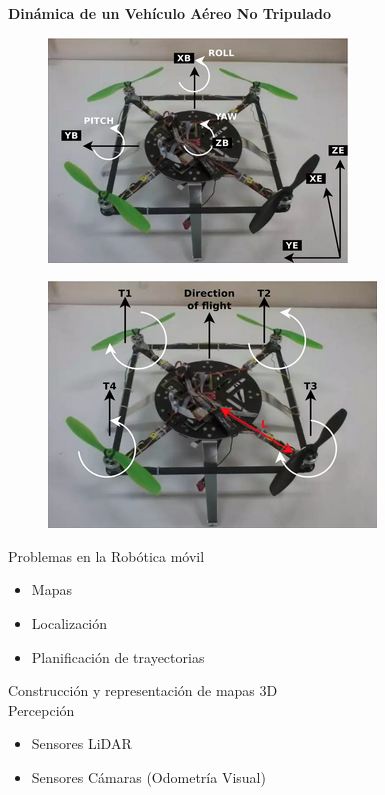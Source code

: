 \documentclass[
	11pt, %
]{beamer}
\begin{document}
\begin{frame}
  \textbf{Dinámica de un Vehículo Aéreo No Tripulado}

  \begin{figure}
    \includegraphics[width=0.5\linewidth]{d4.png}
  \end{figure}

  \begin{figure}
    \includegraphics[width=0.5\linewidth]{d5.png}
  \end{figure}
\end{frame}

\begin{frame}
  Problemas en la Robótica móvil
  \begin{itemize}
  \item Mapas
  \item Localización
  \item Planificación de trayectorias
  \end{itemize}
\end{frame}


\begin{frame}
  Construcción y representación de mapas 3D\\
  Percepción
  \begin{itemize}
  \item Sensores LiDAR
  \item Sensores Cámaras (Odometría Visual)
  \end{itemize}
\end{frame}
\end{document}
